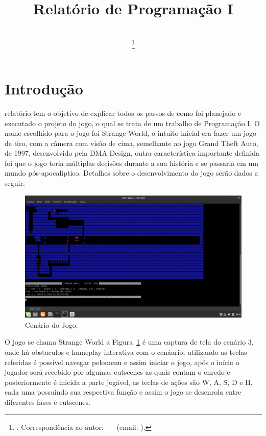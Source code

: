 \documentclass[journal]{IEEEtran}
\title                                                {Relatório de Programação I}
\author{\IEEEauthorblockN{\prenomePrincipal~\nomedomeioPrincipal~\sobrenomePrincipal\IEEEauthorrefmark{1}}
\prenome2~\nomedomeio2~\sobrenome2\IEEEauthorrefmark{2}

\IEEEauthorblockA{\IEEEauthorrefmark{1}Universidade Federal de Santa Catarina (UFSC)}%
\thanks{\Revista. Correspond\^encia ao autor: \prenomePrincipal~\nomedomeioPrincipal~\sobrenomePrincipal~(email: \emailautor).}}
\begin{document}
\maketitle
\IEEEdisplaynontitleabstractindextext
\IEEEpeerreviewmaketitle


\section{Introdução}
 relatório tem o objetivo de explicar todos os passos de como foi planejado e executado o projeto do  jogo, o qual se trata de um trabalho de Programação I.
O nome escolhido para o jogo foi Strange World, o intuito inicial era fazer um jogo de tiro, com a câmera com visão de cima, semelhante ao jogo Grand Theft Auto, de 1997, desenvolvido pela DMA Design, outra característica importante definida foi que o jogo teria múltiplas decisões durante a sua história e se passaria em um mundo pós-apocalíptico. Detalhes sobre o desenvolvimento do jogo serão dados a seguir. 
\begin{figure}[!htbp]
\centering
\includegraphics[width=.50\columnwidth]{figs/png2pdf.pdf}
\caption{Cenário do Jogo.}
\label{fig:fig_exemple}
\end{figure}

O jogo se chama Strange World a Figura~\ref{fig:fig_exemple} é uma captura de tela do cenário 3, onde há obstaculos e hameplay interativa com o cenáario, utilizando as teclas referidas é possível navegar pelomenu e assim iniciar o jogo, após o início o jogador será recebido por algumas cutscenes as quais contam o enredo e posteriormente é inicida a parte jogável, as teclas de ações são W, A, S, D e H, cada uma possuindo sua respectiva função e assim o jogo se desenrola entre diferentes fases e cutscenes. 




\end{document}
